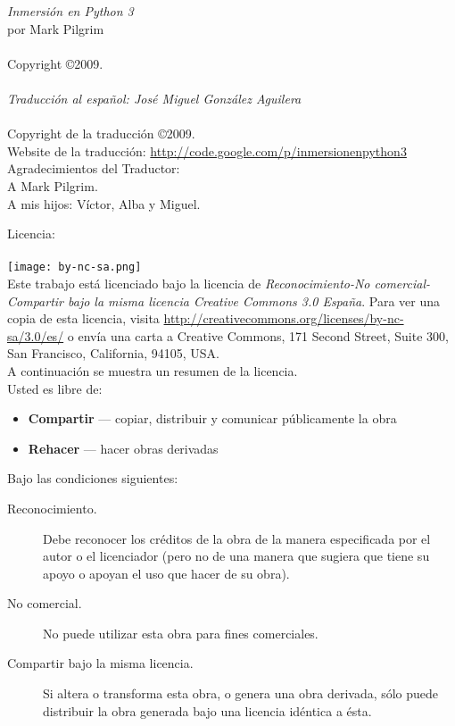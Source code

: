 \pagestyle{empty}
\frontmatter
\noindent
\textsf{\emph{Inmersión en Python 3}}\\
por Mark Pilgrim\\
\\
Copyright \copyright 2009.\\
\\
\textsf{\emph{Traducción al español: José Miguel González Aguilera}}\\
\\
Copyright de la traducción \copyright 2009.\\
Website de la traducción: \href{http://code.google.com/p/inmersionenpython3}{http://code.google.com/p/inmersionenpython3}\\
\linebreak 
\noindent
Agradecimientos del Traductor:\\
A Mark Pilgrim.\\
A mis hijos: Víctor, Alba y Miguel.

\noindent
Licencia:\\
\\
\texttt{[image: by-nc-sa.png]}\\
Este trabajo está licenciado bajo la licencia de \emph{Reconocimiento-No comercial-Compartir bajo la misma licencia Creative Commons 3.0 España}. Para ver una copia de esta licencia, visita \href{http://creativecommons.org/licenses/by-nc-sa/3.0/es/}{http://creativecommons.org/licenses/by-nc-sa/3.0/es/} o envía una carta a Creative Commons, 171 Second Street, Suite 300, San Francisco, California, 94105, USA.\\

\noindent
A continuación se muestra un resumen de la licencia.\\

\noindent
Usted es libre de:
\begin{itemize}
 \item \textbf{Compartir} — copiar, distribuir y comunicar públicamente la obra 
 \item \textbf{Rehacer} — hacer obras derivadas
\end{itemize}
\noindent
Bajo las condiciones siguientes:
\begin{description}
 \item[Reconocimiento.] Debe reconocer los créditos de la obra de la manera especificada por el autor o el licenciador (pero no de una manera que sugiera que tiene su apoyo o apoyan el uso que hacer de su obra).
 \item[No comercial.] No puede utilizar esta obra para fines comerciales.
 \item[Compartir bajo la misma licencia.] Si altera o transforma esta obra, o genera una obra derivada, sólo puede distribuir la obra generada bajo una licencia idéntica a ésta. 
\end{description}


